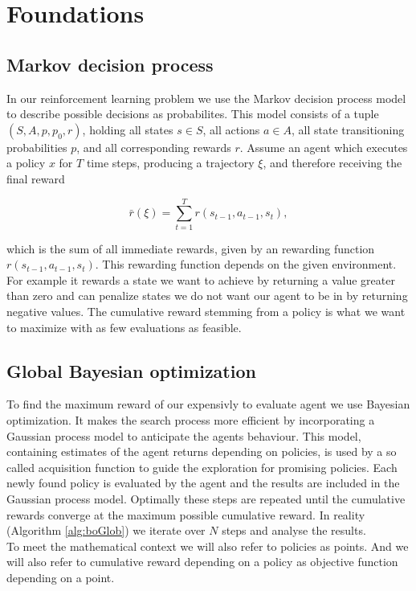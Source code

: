 \chapter{Foundations}
\label{chap:2}

\section{Markov decision process}
In our reinforcement learning problem we use the Markov decision process model to describe possible decisions as probabilites. This model consists of a tuple $(S,A,p,p_{0},r)$, holding all states $s \in S$, all actions $a \in A$, all state transitioning probabilities $p$, and all corresponding rewards $r$. Assume an agent which executes a policy $x$ for $T$ time steps, producing a trajectory $\xi$, and therefore receiving the final reward

$$\bar{r}(\xi)=\sum_{t=1}^T r(s_{t-1}, a_{t-1}, s_{t}),$$

which is the sum of all immediate rewards, given by an rewarding function $r(s_{t-1}, a_{t-1}, s_{t})$. This rewarding function depends on the given environment. For example it rewards a state we want to achieve by returning a value greater than zero and can penalize states we do not want our agent to be in by returning negative values. The cumulative reward stemming from a policy is what we want to maximize with as few evaluations as feasible.

\section{Global Bayesian optimization}
To find the maximum reward of our expensivly to evaluate agent we use Bayesian optimization. It makes the search process more efficient by incorporating a Gaussian process model to  anticipate the agents behaviour. This model, containing estimates of the agent returns depending on policies, is used by a so called acquisition function to guide the exploration for promising policies. Each newly found policy is evaluated by the agent and the results are included in the Gaussian process model. Optimally these steps are repeated until the cumulative rewards converge at the maximum possible cumulative reward. In reality (Algorithm \ref{alg:boGlob}) we iterate over $N$ steps and analyse the results.\\
To meet the mathematical context we will also refer to policies as points. And we will also refer to cumulative reward depending on a policy as objective function depending on a point.


